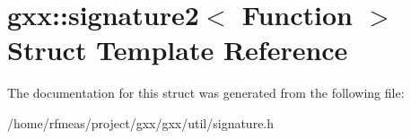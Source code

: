 \hypertarget{structgxx_1_1signature2}{}\section{gxx\+:\+:signature2$<$ Function $>$ Struct Template Reference}
\label{structgxx_1_1signature2}


The documentation for this struct was generated from the following file\+:\begin{DoxyCompactItemize}
\item 
/home/rfmeas/project/gxx/gxx/util/signature.\+h\end{DoxyCompactItemize}
